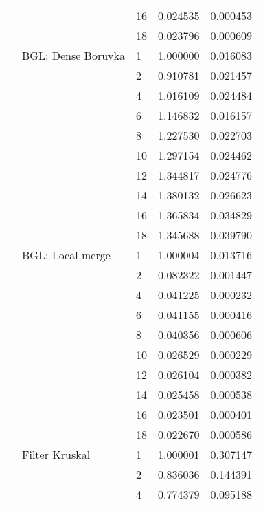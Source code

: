 \begin{tabular}{lllrr}
                      &            & 16 &  0.024535 &  0.000453 \\
                      &            & 18 &  0.023796 &  0.000609 \\
                      & BGL: Dense Boruvka & 1  &  1.000000 &  0.016083 \\
                      &            & 2  &  0.910781 &  0.021457 \\
                      &            & 4  &  1.016109 &  0.024484 \\
                      &            & 6  &  1.146832 &  0.016157 \\
                      &            & 8  &  1.227530 &  0.022703 \\
                      &            & 10 &  1.297154 &  0.024462 \\
                      &            & 12 &  1.344817 &  0.024776 \\
                      &            & 14 &  1.380132 &  0.026623 \\
                      &            & 16 &  1.365834 &  0.034829 \\
                      &            & 18 &  1.345688 &  0.039790 \\
                      & BGL: Local merge & 1  &  1.000004 &  0.013716 \\
                      &            & 2  &  0.082322 &  0.001447 \\
                      &            & 4  &  0.041225 &  0.000232 \\
                      &            & 6  &  0.041155 &  0.000416 \\
                      &            & 8  &  0.040356 &  0.000606 \\
                      &            & 10 &  0.026529 &  0.000229 \\
                      &            & 12 &  0.026104 &  0.000382 \\
                      &            & 14 &  0.025458 &  0.000538 \\
                      &            & 16 &  0.023501 &  0.000401 \\
                      &            & 18 &  0.022670 &  0.000586 \\
                      & Filter Kruskal & 1  &  1.000001 &  0.307147 \\
                      &            & 2  &  0.836036 &  0.144391 \\
                      &            & 4  &  0.774379 &  0.095188 \\

\end{tabular}
